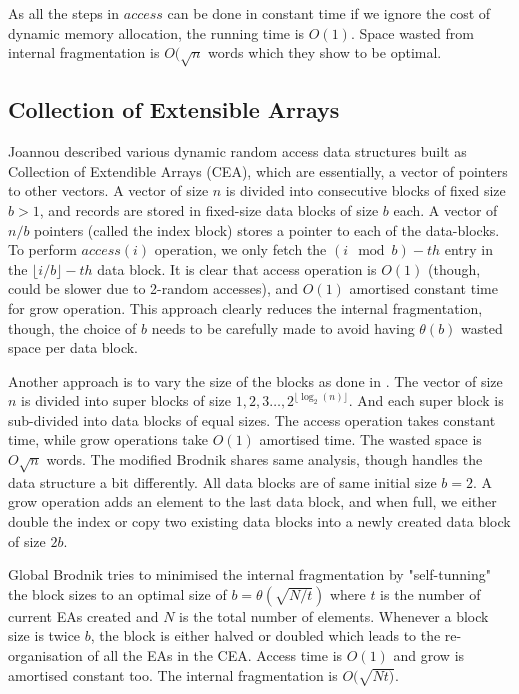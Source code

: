 As all the steps in $access$ can be done in constant time if we ignore the cost of dynamic memory allocation, the running time is $O(1)$. Space wasted from internal fragmentation is $O(\sqrt{n}$ words which they show to be optimal.
\subsection{Collection of Extensible Arrays}
Joannou \cite{Stelios_2001} described various dynamic random access data structures built as Collection of Extendible Arrays (CEA), which are essentially, a vector of pointers to other vectors. A vector of size $n$ is divided into consecutive blocks of fixed size $b > 1$, and records are stored in fixed-size data blocks of size $b$ each. A vector of $n/b$ pointers (called the index block) stores a pointer to each of the data-blocks. To perform $access(i)$ operation, we only fetch the $(i \mod b)-th$ entry in the $\lfloor i/b \rfloor-th$ data block. It is clear that access operation is $O(1)$ (though, could be slower due to 2-random accesses), and $O(1)$ amortised constant time for grow operation. This approach clearly reduces the internal fragmentation, though, the choice of $b$ needs to be carefully made to avoid having $\theta (b)$ wasted space per data block. \par
Another approach is to vary the size of the blocks as done in \cite{Brodnik_1999}. The vector of size $n$ is divided into super blocks of size $1, 2, 3 \ldots, 2^{\lfloor \log_2 (n) \rfloor}$. And each super block is sub-divided into data blocks of equal sizes. The access operation takes constant time, while grow operations take $O(1)$ amortised time. The wasted space is $O\sqrt{n}$ words. The modified Brodnik shares same analysis, though handles the data structure a bit differently. All data blocks are of same initial size $b=2$. A grow operation adds an element to the last data block, and when full, we either double the index or copy two existing data blocks into a newly created data block of size $2b$. \par
Global Brodnik tries to minimised the internal fragmentation by "self-tunning" the block sizes to an optimal size of $b=\theta (\sqrt{N/t})$ where $t$ is the number of current EAs created and $N$ is the total number of elements. Whenever a block size is twice $b$, the block is either halved or doubled which leads to the re-organisation of all the EAs in the CEA. Access time is $O(1)$ and grow is amortised constant too. The internal fragmentation is $O(\sqrt{Nt)}$. \par
